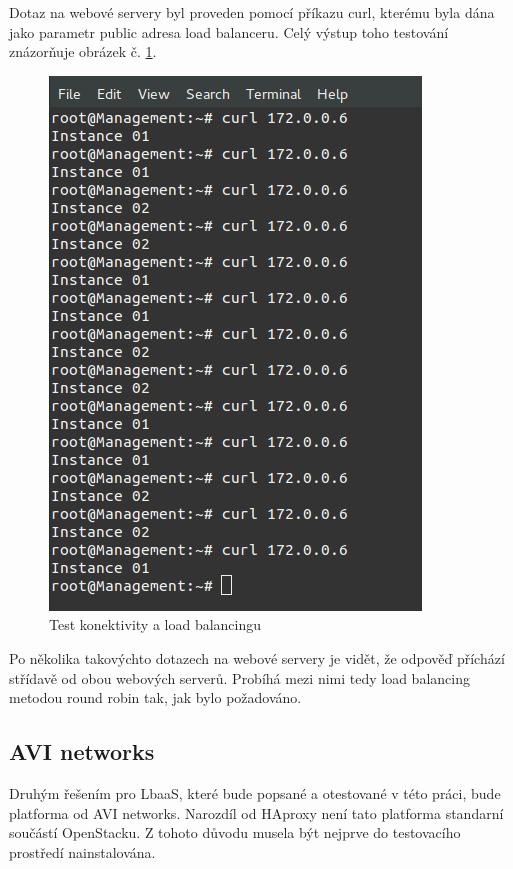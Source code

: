 Dotaz na webové servery byl proveden pomocí příkazu curl, kterému byla dána jako parametr public adresa load balanceru. Celý výstup toho testování znázorňuje obrázek č. \ref{fig:lbaas_testing}. 

\begin{figure}[h]
\begin{centering}
\includegraphics[scale=0.45]{images/lbaas_testing}
\par\end{centering}
\caption{Test konektivity a load balancingu\label{fig:lbaas_testing}}
\end{figure}

Po několika takovýchto dotazech na webové servery je vidět, že odpověď příchází střídavě od obou webových serverů. Probíhá mezi nimi tedy load balancing metodou round robin tak, jak bylo požadováno.

\subsection{AVI networks}

Druhým řešením pro LbaaS, které bude popsané a otestované v této práci, bude platforma od AVI networks. Narozdíl od HAproxy není tato platforma standarní součástí OpenStacku. Z tohoto důvodu musela být nejprve do testovacího prostředí nainstalována. 

